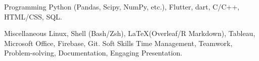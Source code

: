 

\begin{cvskills}

  \cvskill
    {Programming} %
    {Python (Pandas, Scipy, NumPy, etc.), Flutter, dart, C/C++, HTML/CSS, SQL.} %

  \cvskill
    {Miscellaneous} %
    {Linux, Shell (Bash/Zsh), \LaTeX (Overleaf/R Markdown), Tableau, Microsoft Office, Firebase, Git.} %
  \cvskill
    {Soft Skills} %
    {Time Management, Teamwork, Problem-solving, Documentation, Engaging Presentation.} %

\end{cvskills}
